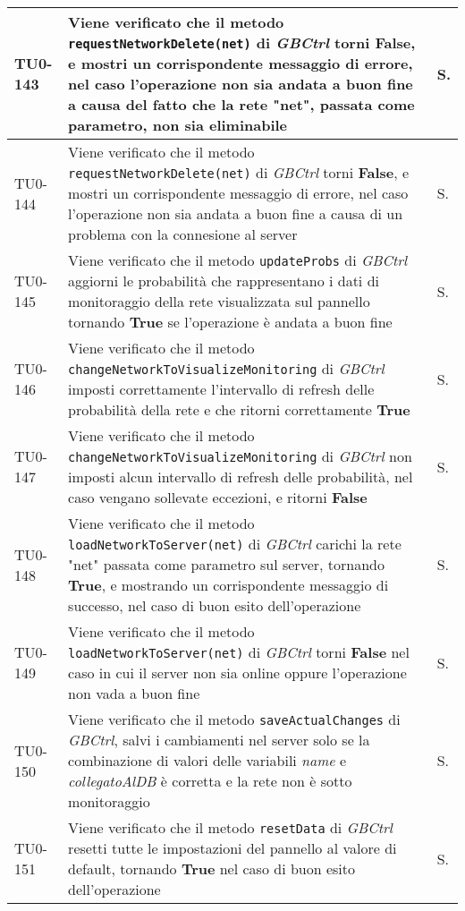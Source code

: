 \begin{longtable}{|C{.15\textwidth}|m{.66\textwidth}|C{.10\textwidth}|}
\hline
{}TU0-143 & Viene verificato che il metodo \texttt{requestNetworkDelete(net)} di \textit{GBCtrl} torni \textbf{False}, e mostri un corrispondente messaggio di errore, nel caso l'operazione non sia andata a buon fine a causa del fatto che la rete "net", passata come parametro, non sia eliminabile & S.\\
\hline
TU0-144 & Viene verificato che il metodo \texttt{requestNetworkDelete(net)} di \textit{GBCtrl} torni \textbf{False}, e mostri un corrispondente messaggio di errore, nel caso l'operazione non sia andata a buon fine a causa di un problema con la connesione al server & S.\\
\hline
{}TU0-145 & Viene verificato che il metodo \texttt{updateProbs} di \textit{GBCtrl} aggiorni le probabilità che rappresentano i dati di monitoraggio della rete visualizzata sul pannello tornando \textbf{True} se l'operazione è andata a buon fine & S.\\
\hline
TU0-146 & Viene verificato che il metodo \texttt{changeNetworkToVisualizeMonitoring} di \textit{GBCtrl} imposti correttamente l'intervallo di refresh delle probabilità della rete e che ritorni correttamente \textbf{True} & S.\\
\hline
{}TU0-147 & Viene verificato che il metodo \texttt{changeNetworkToVisualizeMonitoring} di \textit{GBCtrl} non imposti alcun intervallo di refresh delle probabilità, nel caso vengano sollevate eccezioni, e ritorni \textbf{False} & S.\\
\hline
TU0-148 & Viene verificato che il metodo \texttt{loadNetworkToServer(net)} di \textit{GBCtrl} carichi la rete "net" passata come parametro sul server, tornando \textbf{True}, e mostrando un corrispondente messaggio di successo, nel caso di buon esito dell'operazione & S.\\
\hline
{}TU0-149 & Viene verificato che il metodo \texttt{loadNetworkToServer(net)} di \textit{GBCtrl} torni \textbf{False} nel caso in cui il server non sia online oppure l'operazione non vada a buon fine & S.\\
\hline
TU0-150 & Viene verificato che il metodo \texttt{saveActualChanges} di \textit{GBCtrl}, salvi i cambiamenti nel server solo se la combinazione di valori delle variabili \textit{name} e \textit{collegatoAlDB} è corretta e la rete non è sotto monitoraggio & S.\\
\hline
{}TU0-151 & Viene verificato che il metodo \texttt{resetData} di \textit{GBCtrl} resetti tutte le impostazioni del pannello al valore di default, tornando \textbf{True} nel caso di buon esito dell'operazione & S.\\

\end{longtable}
